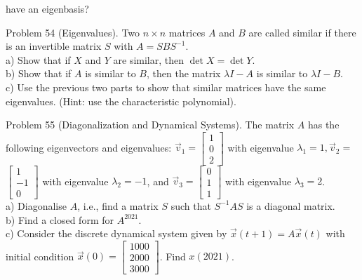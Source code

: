 \documentclass[10pt]{article}
\begin{document}
have an eigenbasis?

Problem 54 (Eigenvalues). Two $n \times n$ matrices $A$ and $B$ are called similar if there is an invertible matrix $S$ with $A=S B S^{-1}$.\\
a) Show that if $X$ and $Y$ are similar, then $\operatorname{det} X=\operatorname{det} Y$.\\
b) Show that if $A$ is similar to $B$, then the matrix $\lambda I-A$ is similar to $\lambda I-B$.\\
c) Use the previous two parts to show that similar matrices have the same eigenvalues. (Hint: use the characteristic polynomial).

Problem 55 (Diagonalization and Dynamical Systems). The matrix $A$ has the following eigenvectors and eigenvalues: $\vec{v}_{1}=\left[\begin{array}{l}1 \\ 0 \\ 2\end{array}\right]$ with eigenvalue $\lambda_{1}=1, \vec{v}_{2}=$ $\left[\begin{array}{c}1 \\ -1 \\ 0\end{array}\right]$ with eigenvalue $\lambda_{2}=-1$, and $\vec{v}_{3}=\left[\begin{array}{l}0 \\ 1 \\ 1\end{array}\right]$ with eigenvalue $\lambda_{3}=2$.\\
a) Diagonalise $A$, i.e., find a matrix $S$ such that $S^{-1} A S$ is a diagonal matrix.\\
b) Find a closed form for $A^{2021}$.\\
c) Consider the discrete dynamical system given by $\vec{x}(t+1)=A \vec{x}(t)$ with initial condition $\vec{x}(0)=\left[\begin{array}{l}1000 \\ 2000 \\ 3000\end{array}\right]$. Find $x(2021)$.
\end{document}
